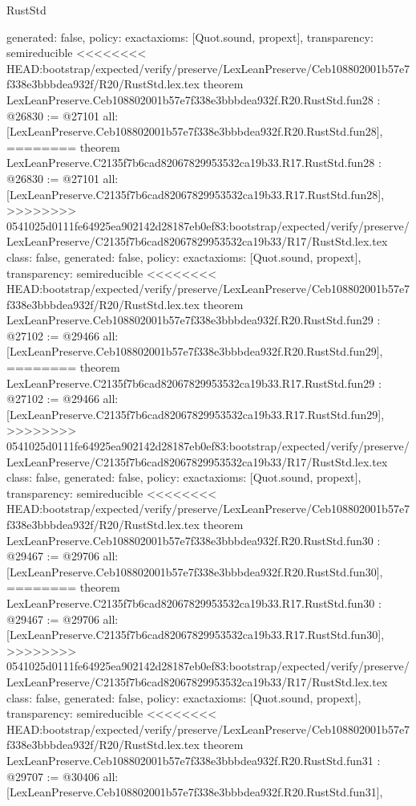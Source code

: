 \begin{lexlean}{RustStd}
\begin{coremodule}
{\begin{coremodule}
{{{{{{{{{{{{{{{{{{{{{{{{{{{{{{{  generated: false,
  policy: exact{axioms: [Quot.sound, propext]},
  transparency: semireducible
}
<<<<<<<< HEAD:bootstrap/expected/verify/preserve/LexLeanPreserve/Ceb108802001b57e7f338e3bbbdea932f/R20/RustStd.lex.tex
theorem LexLeanPreserve.Ceb108802001b57e7f338e3bbbdea932f.R20.RustStd.fun28 : @26830 := @27101 {
  all: [LexLeanPreserve.Ceb108802001b57e7f338e3bbbdea932f.R20.RustStd.fun28],
========
theorem LexLeanPreserve.C2135f7b6cad82067829953532ca19b33.R17.RustStd.fun28 : @26830 := @27101 {
  all: [LexLeanPreserve.C2135f7b6cad82067829953532ca19b33.R17.RustStd.fun28],
>>>>>>>> 0541025d0111fe64925ea902142d28187eb0ef83:bootstrap/expected/verify/preserve/LexLeanPreserve/C2135f7b6cad82067829953532ca19b33/R17/RustStd.lex.tex
  class: false,
  generated: false,
  policy: exact{axioms: [Quot.sound, propext]},
  transparency: semireducible
}
<<<<<<<< HEAD:bootstrap/expected/verify/preserve/LexLeanPreserve/Ceb108802001b57e7f338e3bbbdea932f/R20/RustStd.lex.tex
theorem LexLeanPreserve.Ceb108802001b57e7f338e3bbbdea932f.R20.RustStd.fun29 : @27102 := @29466 {
  all: [LexLeanPreserve.Ceb108802001b57e7f338e3bbbdea932f.R20.RustStd.fun29],
========
theorem LexLeanPreserve.C2135f7b6cad82067829953532ca19b33.R17.RustStd.fun29 : @27102 := @29466 {
  all: [LexLeanPreserve.C2135f7b6cad82067829953532ca19b33.R17.RustStd.fun29],
>>>>>>>> 0541025d0111fe64925ea902142d28187eb0ef83:bootstrap/expected/verify/preserve/LexLeanPreserve/C2135f7b6cad82067829953532ca19b33/R17/RustStd.lex.tex
  class: false,
  generated: false,
  policy: exact{axioms: [Quot.sound, propext]},
  transparency: semireducible
}
<<<<<<<< HEAD:bootstrap/expected/verify/preserve/LexLeanPreserve/Ceb108802001b57e7f338e3bbbdea932f/R20/RustStd.lex.tex
theorem LexLeanPreserve.Ceb108802001b57e7f338e3bbbdea932f.R20.RustStd.fun30 : @29467 := @29706 {
  all: [LexLeanPreserve.Ceb108802001b57e7f338e3bbbdea932f.R20.RustStd.fun30],
========
theorem LexLeanPreserve.C2135f7b6cad82067829953532ca19b33.R17.RustStd.fun30 : @29467 := @29706 {
  all: [LexLeanPreserve.C2135f7b6cad82067829953532ca19b33.R17.RustStd.fun30],
>>>>>>>> 0541025d0111fe64925ea902142d28187eb0ef83:bootstrap/expected/verify/preserve/LexLeanPreserve/C2135f7b6cad82067829953532ca19b33/R17/RustStd.lex.tex
  class: false,
  generated: false,
  policy: exact{axioms: [Quot.sound, propext]},
  transparency: semireducible
}
<<<<<<<< HEAD:bootstrap/expected/verify/preserve/LexLeanPreserve/Ceb108802001b57e7f338e3bbbdea932f/R20/RustStd.lex.tex
theorem LexLeanPreserve.Ceb108802001b57e7f338e3bbbdea932f.R20.RustStd.fun31 : @29707 := @30406 {
  all: [LexLeanPreserve.Ceb108802001b57e7f338e3bbbdea932f.R20.RustStd.fun31],
}}}}}}}}}}}}}}}}}}}}}}}}}}}}}}}}}}
\end{coremodule}}
\end{coremodule}
\end{lexlean}
